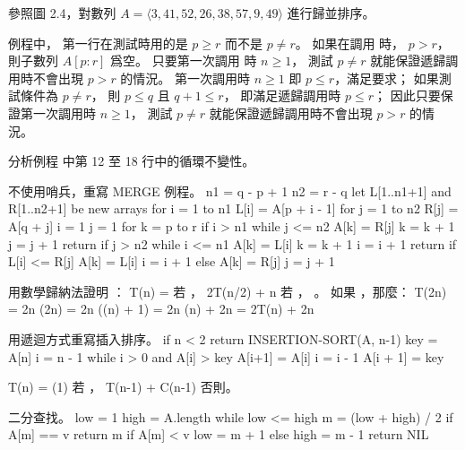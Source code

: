\startsection[
  title={Designing algorithms},
]

\startEXERCISE
參照圖 2.4，對數列 $A=\langle 3,41,52,26,38,57,9,49\rangle$ 進行歸並排序。
\stopEXERCISE
\startANSWER
\externalfigure[output/e2_3_1-1]
\stopANSWER

\startEXERCISE
{} 例程中，
第一行在測試時用的是 $p\ge r$ 而不是 $p\ne r$。
如果在調用  時， $p>r$，
則子數列 $A[p:r]$ 爲空。
只要第一次調用  時 $n\ge 1$，
測試 $p\ne r$ 就能保證遞歸調用時不會出現 $p>r$ 的情況。
\stopEXERCISE
\startANSWER
第一次調用時 $n\ge 1$ 即 $p\le r$，滿足要求；
如果測試條件為 $p\ne r$，
則 $p\le q$ 且 $q+1\le r$，
即滿足遞歸調用時 $p\le r$；
因此只要保證第一次調用時 $n\ge 1$，
測試 $p\ne r$ 就能保證遞歸調用時不會出現 $p>r$ 的情況。
\stopANSWER

\startEXERCISE
分析例程 中第 12 至 18 行中的循環不變性。
\stopEXERCISE

\startEXERCISE
不使用哨兵，重寫 MERGE 例程。
\stopEXERCISE
\startANSWER
\startCLRS
n1 = q - p + 1
n2 = r - q
let L[1..n1+1] and R[1..n2+1] be new arrays
for i = 1 to n1
	L[i] = A[p + i - 1]
for j = 1 to n2
	R[j] = A[q + j]
i = 1
j = 1
for k = p to r
	if i > n1
		while j <= n2
			A[k] = R[j]
			k = k + 1
			j = j + 1
		return
	if j > n2
		while i <= n1
			A[k] = L[i]
			k = k + 1
			i = i + 1
		return
	if L[i] <= R[j]
		A[k] = L[i]
		i = i + 1
	else A[k] = R[j]
		j = j + 1
\stopCLRS
\stopANSWER

\startEXERCISE
用數學歸納法證明 ：
\startformula
T(n) = \startmathcases
{}		\NC 若 ， \NR
\NC 2T(n/2) + n	\NC 若 ， 。 \NR
\stopmathcases
\stopformula
\stopEXERCISE
\startANSWER
如果 ，那麼：
\startformula\startalign
\NC T(2n)	\NC = 2n \lg(2n) \NR
\NC		\NC = 2n (\lg(n) + 1) \NR
\NC		\NC = 2n \lg(n) + 2n \NR
\NC		\NC = 2T(n) + 2n \NR
\stopalign\stopformula
\stopANSWER

\startEXERCISE
用遞迴方式重寫插入排序。
\stopEXERCISE
\startANSWER
{}
\startCLRS
if n < 2
	return
INSERTION-SORT(A, n-1)
key = A[n]
i = n - 1
while i > 0 and A[i] > key
	A[i+1] = A[i]
	i = i - 1
A[i + 1] = key
\stopCLRS

\startformula
T(n) = \startmathcases
\NC \Theta(1)		\NC 若 ， \NR
\NC T(n-1) + C(n-1)	\NC 否則。 \NR
\stopmathcases
\stopformula
\stopANSWER

二分查找。
\stopEXERCISE
\startANSWER
{}
\startCLRS
low = 1
high = A.length
while low <= high
	m = (low + high) / 2
	if A[m] == v
		return m
	if A[m] < v
		low = m + 1
	else
		high = m - 1
return NIL
\stopCLRS

